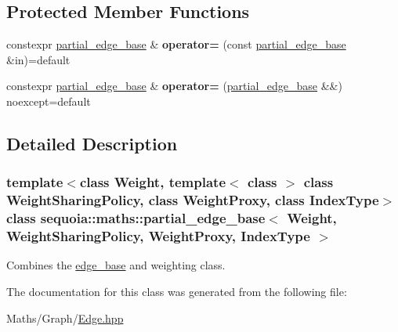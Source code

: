 \subsection*{Protected Member Functions}
\begin{DoxyCompactItemize}
\item 
\mbox{\label{classsequoia_1_1maths_1_1partial__edge__base_a03ed4dd1a07f6696d155329c068fc875}} 
constexpr \mbox{\hyperlink{classsequoia_1_1maths_1_1partial__edge__base}{partial\+\_\+edge\+\_\+base}} \& {\bfseries operator=} (const \mbox{\hyperlink{classsequoia_1_1maths_1_1partial__edge__base}{partial\+\_\+edge\+\_\+base}} \&in)=default
\item 
\mbox{\label{classsequoia_1_1maths_1_1partial__edge__base_a1be9a34231d7165b186f40d603ffaffe}} 
constexpr \mbox{\hyperlink{classsequoia_1_1maths_1_1partial__edge__base}{partial\+\_\+edge\+\_\+base}} \& {\bfseries operator=} (\mbox{\hyperlink{classsequoia_1_1maths_1_1partial__edge__base}{partial\+\_\+edge\+\_\+base}} \&\&) noexcept=default
\end{DoxyCompactItemize}


\subsection{Detailed Description}
\subsubsection*{template$<$class Weight, template$<$ class $>$ class Weight\+Sharing\+Policy, class Weight\+Proxy, class Index\+Type$>$\newline
class sequoia\+::maths\+::partial\+\_\+edge\+\_\+base$<$ Weight, Weight\+Sharing\+Policy, Weight\+Proxy, Index\+Type $>$}

Combines the \mbox{\hyperlink{classsequoia_1_1maths_1_1edge__base}{edge\+\_\+base}} and weighting class. 

The documentation for this class was generated from the following file\+:\begin{DoxyCompactItemize}
\item 
Maths/\+Graph/\mbox{\hyperlink{_edge_8hpp}{Edge.\+hpp}}\end{DoxyCompactItemize}
